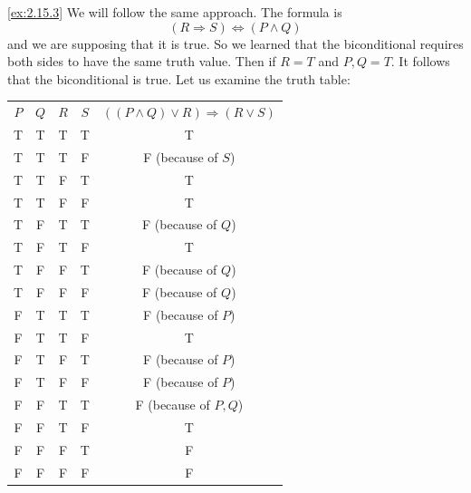 \begin{solution}\label{sol:2.15.3}\ref{ex:2.15.3}
    We will follow the same approach. The formula is 
    $$
    (R\Rightarrow S)\Leftrightarrow (P\land Q)
    $$
    and we are supposing that it is true. So we learned that the biconditional requires both sides to have the same truth value. Then if $R=T$ and $P,Q=T$. It follows that the biconditional is true. Let us examine the truth table:
    \begin{table}[H]
        \centering
        \begin{tabular}{ccccc}
            \toprule
            $P$ & $Q$ & $R$ & $S$ & $((P\land Q)\lor R)\Rightarrow (R\lor S)$\\
            T & T & T & T & T\\
            T & T & T & F & F (because of $S$)\\
            T & T & F & T & T\\
            T & T & F & F & T\\
            T & F & T & T & F (because of $Q$)\\
            T & F & T & F & T\\
            T & F & F & T & F (because of $Q$)\\
            T & F & F & F & F (because of $Q$)\\
            F & T & T & T & F (because of $P$)\\
            F & T & T & F & T\\
            F & T & F & T & F (because of $P$)\\
            F & T & F & F & F (because of $P$)\\
            F & F & T & T & F (because of $P,Q$)\\
            F & F & T & F & T\\
            F & F & F & T & F\\
            F & F & F & F & F\\
            \bottomrule
        \end{tabular}
    \end{table}
\end{solution}